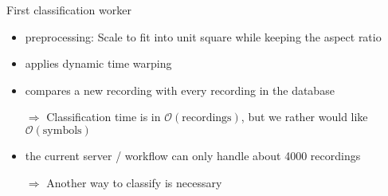 \begin{frame}{First classification worker}
    \begin{itemize}
        \item preprocessing: Scale to fit into unit square while keeping the aspect
              ratio
        \item applies dynamic time warping
        \item compares a new recording with every recording
              in the database
        \item[$\Rightarrow$] Classification time is in $\mathcal{O}(\text{recordings})$,
              but we rather would like $\mathcal{O}(\text{symbols})$
        \item the current server / workflow can only handle about 4000 recordings
        \item[$\Rightarrow$] Another way to classify is necessary
    \end{itemize}
\end{frame}
